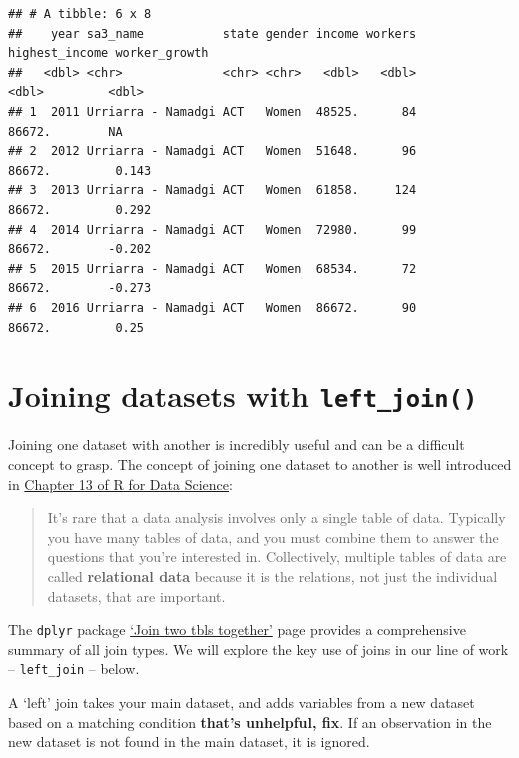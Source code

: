 \documentclass[
]{book}
\begin{document}
\begin{verbatim}
## # A tibble: 6 x 8
##    year sa3_name           state gender income workers highest_income worker_growth
##   <dbl> <chr>              <chr> <chr>   <dbl>   <dbl>          <dbl>         <dbl>
## 1  2011 Urriarra - Namadgi ACT   Women  48525.      84         86672.        NA    
## 2  2012 Urriarra - Namadgi ACT   Women  51648.      96         86672.         0.143
## 3  2013 Urriarra - Namadgi ACT   Women  61858.     124         86672.         0.292
## 4  2014 Urriarra - Namadgi ACT   Women  72980.      99         86672.        -0.202
## 5  2015 Urriarra - Namadgi ACT   Women  68534.      72         86672.        -0.273
## 6  2016 Urriarra - Namadgi ACT   Women  86672.      90         86672.         0.25
\end{verbatim}

\hypertarget{joining-datasets-with-left_join}{%
\section{\texorpdfstring{Joining datasets with \texttt{left\_join()}}{Joining datasets with left\_join()}}\label{joining-datasets-with-left_join}}

Joining one dataset with another is incredibly useful and can be a difficult concept to grasp. The concept of joining one dataset to another is well introduced in \href{https://r4ds.had.co.nz/relational-data.html}{Chapter 13 of R for Data Science}:

\begin{quote}
It's rare that a data analysis involves only a single table of data. Typically you have many tables of data, and you must combine them to answer the questions that you're interested in. Collectively, multiple tables of data are called \textbf{relational data} because it is the relations, not just the individual datasets, that are important.
\end{quote}

The \texttt{dplyr} package \href{https://dplyr.tidyverse.org/reference/join.html}{`Join two tbls together'} page provides a comprehensive summary of all join types. We will explore the key use of joins in our line of work -- \texttt{left\_join} -- below.

A `left' join takes your main dataset, and adds variables from a new dataset based on a matching condition \textbf{that's unhelpful, fix}. If an observation in the new dataset is not found in the main dataset, it is ignored.
\end{document}
